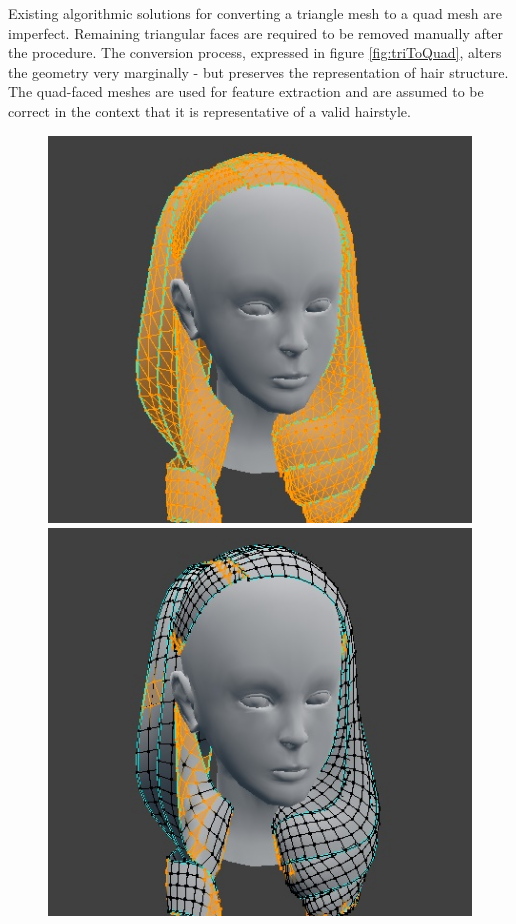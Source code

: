 \documentclass[ %
author={Dillon Keith Diep},
supervisor={Dr. Carl Henrik Ek},
degree={MEng},
title={ART-CG Hair:},
subtitle={Assisted Real-time Content Generation of Stylised Virtual Hair},
type={Research},
year={2017} ]{dissertation}
\begin{document}
Existing algorithmic solutions for converting a triangle mesh to a quad mesh are imperfect. Remaining triangular faces are required to be removed manually after the procedure. The conversion process, expressed in figure \ref{fig:triToQuad}, alters the geometry very marginally - but preserves the representation of hair structure. The quad-faced meshes are used for feature extraction and are assumed to be correct in the context that it is representative of a valid hairstyle. 

\begin{figure}[!h]
	\centering
	\includegraphics[scale=2]{images/triToQuad1}
	\includegraphics[scale=2]{images/triToQuad2}

\end{figure}
\end{document}
